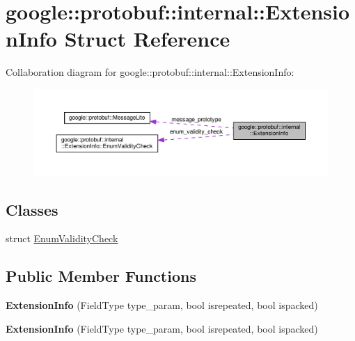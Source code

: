 \hypertarget{structgoogle_1_1protobuf_1_1internal_1_1ExtensionInfo}{}\section{google\+:\+:protobuf\+:\+:internal\+:\+:Extension\+Info Struct Reference}
\label{structgoogle_1_1protobuf_1_1internal_1_1ExtensionInfo}


Collaboration diagram for google\+:\+:protobuf\+:\+:internal\+:\+:Extension\+Info\+:
\nopagebreak
\begin{figure}[H]
\begin{center}
\leavevmode
\includegraphics[width=350pt]{structgoogle_1_1protobuf_1_1internal_1_1ExtensionInfo__coll__graph}
\end{center}
\end{figure}
\subsection*{Classes}
\begin{DoxyCompactItemize}
\item 
struct \hyperlink{structgoogle_1_1protobuf_1_1internal_1_1ExtensionInfo_1_1EnumValidityCheck}{Enum\+Validity\+Check}
\end{DoxyCompactItemize}
\subsection*{Public Member Functions}
\begin{DoxyCompactItemize}
\item 
\mbox{\label{structgoogle_1_1protobuf_1_1internal_1_1ExtensionInfo_a561dd4a9b7e9cfd3eb419e3a219d2371}} 
{\bfseries Extension\+Info} (Field\+Type type\+\_\+param, bool isrepeated, bool ispacked)
\item 
\mbox{\label{structgoogle_1_1protobuf_1_1internal_1_1ExtensionInfo_a561dd4a9b7e9cfd3eb419e3a219d2371}} 
{\bfseries Extension\+Info} (Field\+Type type\+\_\+param, bool isrepeated, bool ispacked)
\end{DoxyCompactItemize}
